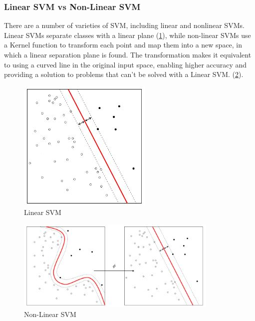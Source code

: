 \subsubsection{Linear SVM vs Non-Linear SVM}
There are a number of varieties of SVM, including linear and nonlinear SVMs. Linear SVMs separate classes with a linear plane (\ref{fig:linear_svm}), while non-linear SVMs use a Kernel function to transform each point and map them into a new space, in which a linear separation plane is found. The transformation makes it equivalent to using a curved line in the original input space, enabling higher accuracy and providing a solution to problems that can’t be solved with a Linear SVM. (\ref{fig:non_linear_svm}). 
\begin{figure}[H]
    \centering
    \includegraphics{figs/8/linear_svm}
    \caption{Linear SVM}
    \label{fig:linear_svm}
\end{figure}

\begin{figure}[H]
    \centering
    \includegraphics{figs/8/non_linear_SVM}
    \caption{Non-Linear SVM}
    \label{fig:non_linear_svm}
\end{figure}

